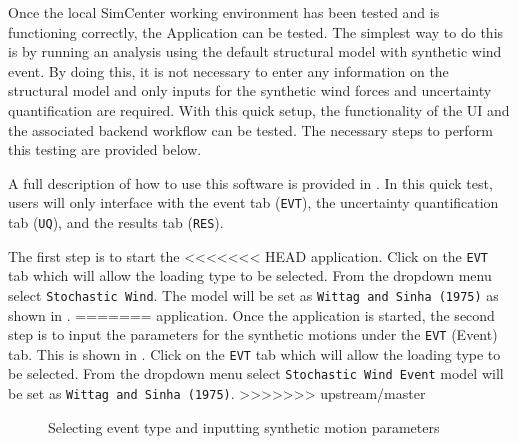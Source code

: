 Once the local SimCenter working environment has been tested and is
functioning correctly, the \texttt{\getsoftwarename{}} Application
can be tested. The simplest way to do this is by running an analysis
using the default structural model with synthetic wind event. By
doing this, it is not necessary to enter any information on the
structural model and only inputs for the synthetic wind forces 
and uncertainty quantification are required. With this quick setup, the
functionality of the \texttt{\getsoftwarename{}} UI and the associated backend
workflow can be tested. The necessary steps to perform this
testing are provided below.

A full description of how to use this software is provided
in .  In this quick test, users will only
interface with the event tab (\texttt{EVT}), the uncertainty
quantification tab (\texttt{UQ}), and the results tab (\texttt{RES}).

The first step is to start the \texttt{\getsoftwarename{}}
<<<<<<< HEAD
application. Click on the \texttt{EVT} tab which will allow 
the loading type to be selected. From the dropdown menu select 
\texttt{Stochastic Wind}. The model will be set as 
\texttt{Wittag and Sinha (1975)} as shown in .
=======
application.  Once the application is started, the second step is to
input the parameters for the synthetic motions under the \texttt{EVT}
(Event) tab. This is shown in . Click
on the \texttt{EVT} tab which will allow the loading type to be
selected. From the dropdown menu select \texttt{Stochastic Wind Event}
model will be set as \texttt{Wittag and Sinha (1975)}.
>>>>>>> upstream/master

\begin{figure}[!htbp]
  \caption{Selecting event type and inputting synthetic motion parameters}
  \label{fig:input_event}
\end{figure}

